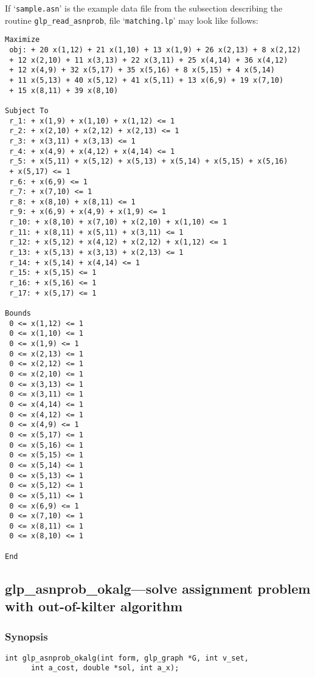 \documentclass[dvipdfm,11pt]{report}
\begin{document}
If `\verb|sample.asn|' is the example data file from the subsection
describing the routine \verb|glp_read_asnprob|, file
`\verb|matching.lp|' may look like follows:

\begin{footnotesize}
\begin{verbatim}
Maximize
 obj: + 20 x(1,12) + 21 x(1,10) + 13 x(1,9) + 26 x(2,13) + 8 x(2,12)
 + 12 x(2,10) + 11 x(3,13) + 22 x(3,11) + 25 x(4,14) + 36 x(4,12)
 + 12 x(4,9) + 32 x(5,17) + 35 x(5,16) + 8 x(5,15) + 4 x(5,14)
 + 11 x(5,13) + 40 x(5,12) + 41 x(5,11) + 13 x(6,9) + 19 x(7,10)
 + 15 x(8,11) + 39 x(8,10)

Subject To
 r_1: + x(1,9) + x(1,10) + x(1,12) <= 1
 r_2: + x(2,10) + x(2,12) + x(2,13) <= 1
 r_3: + x(3,11) + x(3,13) <= 1
 r_4: + x(4,9) + x(4,12) + x(4,14) <= 1
 r_5: + x(5,11) + x(5,12) + x(5,13) + x(5,14) + x(5,15) + x(5,16)
 + x(5,17) <= 1
 r_6: + x(6,9) <= 1
 r_7: + x(7,10) <= 1
 r_8: + x(8,10) + x(8,11) <= 1
 r_9: + x(6,9) + x(4,9) + x(1,9) <= 1
 r_10: + x(8,10) + x(7,10) + x(2,10) + x(1,10) <= 1
 r_11: + x(8,11) + x(5,11) + x(3,11) <= 1
 r_12: + x(5,12) + x(4,12) + x(2,12) + x(1,12) <= 1
 r_13: + x(5,13) + x(3,13) + x(2,13) <= 1
 r_14: + x(5,14) + x(4,14) <= 1
 r_15: + x(5,15) <= 1
 r_16: + x(5,16) <= 1
 r_17: + x(5,17) <= 1

Bounds
 0 <= x(1,12) <= 1
 0 <= x(1,10) <= 1
 0 <= x(1,9) <= 1
 0 <= x(2,13) <= 1
 0 <= x(2,12) <= 1
 0 <= x(2,10) <= 1
 0 <= x(3,13) <= 1
 0 <= x(3,11) <= 1
 0 <= x(4,14) <= 1
 0 <= x(4,12) <= 1
 0 <= x(4,9) <= 1
 0 <= x(5,17) <= 1
 0 <= x(5,16) <= 1
 0 <= x(5,15) <= 1
 0 <= x(5,14) <= 1
 0 <= x(5,13) <= 1
 0 <= x(5,12) <= 1
 0 <= x(5,11) <= 1
 0 <= x(6,9) <= 1
 0 <= x(7,10) <= 1
 0 <= x(8,11) <= 1
 0 <= x(8,10) <= 1

End
\end{verbatim}
\end{footnotesize}

\subsection{glp\_asnprob\_okalg---solve assignment problem with
out-of-kilter algorithm}

\subsubsection*{Synopsis}

\begin{verbatim}
int glp_asnprob_okalg(int form, glp_graph *G, int v_set,
      int a_cost, double *sol, int a_x);
\end{verbatim}
\end{document}
